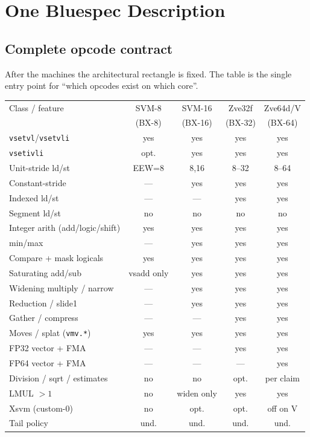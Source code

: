 \chapter{One Bluespec Description}
\label{ch:bsv}

\section{Complete opcode contract}

After the machines the architectural rectangle is fixed. The table is the single entry point for “which opcodes exist on which core”.

\begin{center}
\small
\begin{tabular}{@{}lcccc@{}}
\toprule
Class / feature & SVM-8 & SVM-16 & Zve32f & Zve64d/V \\
 & (BX-8) & (BX-16) & (BX-32) & (BX-64) \\
\midrule
\texttt{vsetvl}/\texttt{vsetvli} & yes & yes & yes & yes \\
\texttt{vsetivli} & opt. & yes & yes & yes \\
Unit-stride ld/st & EEW=8 & 8,16 & 8--32 & 8--64 \\
Constant-stride & --- & yes & yes & yes \\
Indexed ld/st & --- & --- & yes & yes \\
Segment ld/st & no & no & no & no \\
Integer arith (add/logic/shift) & yes & yes & yes & yes \\
min/max & --- & yes & yes & yes \\
Compare + mask logicals & yes & yes & yes & yes \\
Saturating add/sub & vsadd only & yes & yes & yes \\
Widening multiply / narrow & --- & yes & yes & yes \\
Reduction / slide1 & --- & yes & yes & yes \\
Gather / compress & --- & --- & yes & yes \\
Moves / splat (\texttt{vmv.*}) & yes & yes & yes & yes \\
FP32 vector + FMA & --- & --- & yes & yes \\
FP64 vector + FMA & --- & --- & --- & yes \\
Division / sqrt / estimates & no & no & opt. & per claim \\
LMUL $>1$ & no & widen only & yes & yes \\
Xsvm (custom-0) & no & opt. & opt. & off on V \\
Tail policy & und. & und. & und. & und. \\
\bottomrule
\end{tabular}
\end{center}

